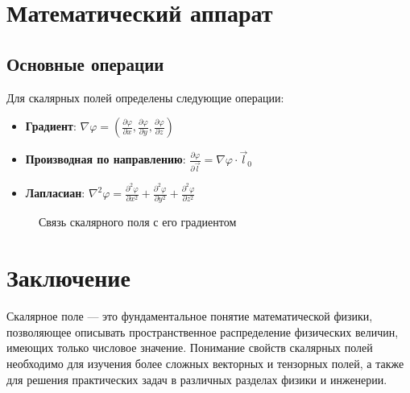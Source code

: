 \documentclass[12pt]{article}
\begin{document}
	\section{Математический аппарат}
	
	\subsection{Основные операции}
	
	Для скалярных полей определены следующие операции:
	
	\begin{itemize}
		\item \textbf{Градиент}: $\nabla\varphi = \left(\frac{\partial\varphi}{\partial x}, \frac{\partial\varphi}{\partial y}, \frac{\partial\varphi}{\partial z}\right)$
		\item \textbf{Производная по направлению}: $\frac{\partial\varphi}{\partial\vec{l}} = \nabla\varphi \cdot \vec{l}_0$
		\item \textbf{Лапласиан}: $\nabla^2\varphi = \frac{\partial^2\varphi}{\partial x^2} + \frac{\partial^2\varphi}{\partial y^2} + \frac{\partial^2\varphi}{\partial z^2}$
	\end{itemize}
	
	\begin{figure}[H]
		\centering
		\caption{Связь скалярного поля с его градиентом}
	\end{figure}
	
	\section*{Заключение}
	
	Скалярное поле — это фундаментальное понятие математической физики, позволяющее описывать пространственное распределение физических величин, имеющих только числовое значение. Понимание свойств скалярных полей необходимо для изучения более сложных векторных и тензорных полей, а также для решения практических задач в различных разделах физики и инженерии.
	
\end{document}
